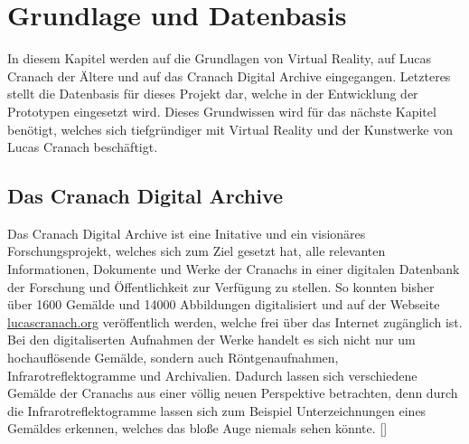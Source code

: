 \documentclass[a4paper,12pt,oneside]{article}
\begin{document}
  \section{Grundlage und Datenbasis}
    In diesem Kapitel werden auf die Grundlagen von Virtual Reality, auf Lucas Cranach 
    der Ältere und auf das Cranach Digital Archive eingegangen. Letzteres stellt 
    die Datenbasis für dieses Projekt dar, welche in der Entwicklung der Prototypen 
    eingesetzt wird. Dieses Grundwissen wird für das nächste Kapitel benötigt, welches 
    sich tiefgründiger mit Virtual Reality und der Kunstwerke von Lucas Cranach
    beschäftigt.

    \subsection{Das Cranach Digital Archive}
      Das Cranach Digital Archive ist eine Initative und ein visionäres Forschungsprojekt, 
      welches sich zum Ziel gesetzt hat, alle relevanten Informationen, Dokumente und 
      Werke der Cranachs in einer digitalen Datenbank der Forschung und Öffentlichkeit zur 
      Verfügung zu stellen.
      So konnten bisher über 1600 Gemälde und 14000 Abbildungen digitalisiert und auf der 
      Webseite \url{lucascranach.org} veröffentlich werden, welche frei über das
      Internet zugänglich ist.
      Bei den digitaliserten Aufnahmen der Werke handelt es sich nicht nur um hochauflösende
      Gemälde, sondern auch Röntgenaufnahmen, Infrarotreflektogramme und
      Archivalien. Dadurch lassen sich verschiedene
      Gemälde der Cranachs aus einer völlig neuen Perspektive betrachten, denn durch die
      Infrarotreflektogramme lassen sich zum Beispiel Unterzeichnungen
      eines Gemäldes erkennen, welches das bloße Auge niemals sehen könnte. [\cite{heydenreich2017lucas}]
\end{document}

